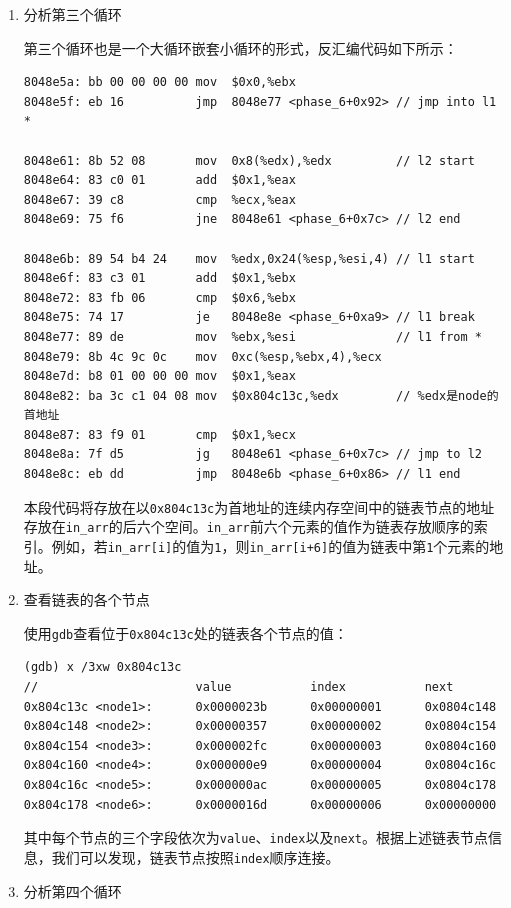 \documentclass{paper}
\begin{document}
\begin{enumerate}
\begin{enumerate}
\item 分析第三个循环

第三个循环也是一个大循环嵌套小循环的形式，反汇编代码如下所示：
\begin{lstlisting}
8048e5a: bb 00 00 00 00 mov  $0x0,%ebx
8048e5f: eb 16          jmp  8048e77 <phase_6+0x92> // jmp into l1 *

8048e61: 8b 52 08       mov  0x8(%edx),%edx         // l2 start
8048e64: 83 c0 01       add  $0x1,%eax
8048e67: 39 c8          cmp  %ecx,%eax
8048e69: 75 f6          jne  8048e61 <phase_6+0x7c> // l2 end

8048e6b: 89 54 b4 24    mov  %edx,0x24(%esp,%esi,4) // l1 start
8048e6f: 83 c3 01       add  $0x1,%ebx
8048e72: 83 fb 06       cmp  $0x6,%ebx
8048e75: 74 17          je   8048e8e <phase_6+0xa9> // l1 break
8048e77: 89 de          mov  %ebx,%esi              // l1 from *
8048e79: 8b 4c 9c 0c    mov  0xc(%esp,%ebx,4),%ecx
8048e7d: b8 01 00 00 00 mov  $0x1,%eax
8048e82: ba 3c c1 04 08 mov  $0x804c13c,%edx        // %edx是node的首地址
8048e87: 83 f9 01       cmp  $0x1,%ecx
8048e8a: 7f d5          jg   8048e61 <phase_6+0x7c> // jmp to l2
8048e8c: eb dd          jmp  8048e6b <phase_6+0x86> // l1 end
\end{lstlisting}
本段代码将存放在以\verb|0x804c13c|为首地址的连续内存空间中的链表节点的地址存放在\verb|in_arr|的后六个空间。\verb|in_arr|前六个元素的值作为链表存放顺序的索引。例如，若\verb|in_arr[i]|的值为\verb|1|，则\verb|in_arr[i+6]|的值为链表中第\verb|1|个元素的地址。

\item 查看链表的各个节点

使用\verb|gdb|查看位于\verb|0x804c13c|处的链表各个节点的值：
\begin{lstlisting}
(gdb) x /3xw 0x804c13c
//                      value           index           next
0x804c13c <node1>:      0x0000023b      0x00000001      0x0804c148
0x804c148 <node2>:      0x00000357      0x00000002      0x0804c154
0x804c154 <node3>:      0x000002fc      0x00000003      0x0804c160
0x804c160 <node4>:      0x000000e9      0x00000004      0x0804c16c
0x804c16c <node5>:      0x000000ac      0x00000005      0x0804c178
0x804c178 <node6>:      0x0000016d      0x00000006      0x00000000
\end{lstlisting}
其中每个节点的三个字段依次为\verb|value|、\verb|index|以及\verb|next|。根据上述链表节点信息，我们可以发现，链表节点按照\verb|index|顺序连接。

\item 分析第四个循环


\end{enumerate}
\end{enumerate}
\end{document}
